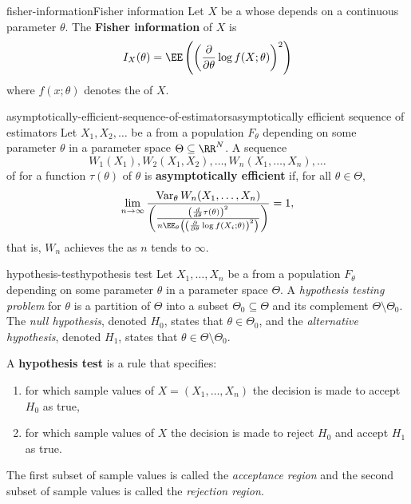 \begin{topic}{fisher-information}{Fisher information}
    Let $X$ be a  whose  depends on a continuous parameter $\theta$. The \textbf{Fisher information} of $X$ is
    \[ I_X(\theta) = \EE \left( \left( \frac{\partial}{\partial \theta} \log f(X; \theta) \right)^2 \right) \]
    where $f(x; \theta)$ denotes the  of $X$.
\end{topic}

\begin{topic}{asymptotically-efficient-sequence-of-estimators}{asymptotically efficient sequence of estimators}
    Let $X_1, X_2, \ldots$ be a  from a population $F_\theta$ depending on some parameter $\theta$ in a parameter space $\Theta \subseteq \RR^N$. A sequence
    \[ W_1(X_1), W_2(X_1, X_2), \ldots, W_n(X_1, \ldots, X_n), \ldots \]
    of  for a function $\tau(\theta)$ of $\theta$ is \textbf{asymptotically efficient} if, for all $\theta \in \Theta$,
    \[ \lim_{n \to \infty} \frac{\operatorname{Var}_\theta W_n(X_1, \ldots, X_n)}{\left( \frac{ \left( \frac{d}{d \theta} \tau(\theta) \right)^2}{n \EE_\theta \left( \left( \frac{\partial}{\partial \theta} \log f(X_i; \theta) \right)^2 \right) } \right)} = 1 , \]
    that is, $W_n$ achieves the  as $n$ tends to $\infty$.
\end{topic}

\begin{topic}{hypothesis-test}{hypothesis test}
    Let $X_1, \ldots, X_n$ be a  from a population $F_\theta$ depending on some parameter $\theta$ in a parameter space $\Theta$.
    A \textit{hypothesis testing problem} for $\theta$ is a partition of $\Theta$ into a subset $\Theta_0 \subseteq \Theta$ and its complement $\Theta \setminus \Theta_0$.
    The \textit{null hypothesis}, denoted $H_0$, states that $\theta \in \Theta_0$, and the \textit{alternative hypothesis}, denoted $H_1$, states that $\theta \in \Theta \setminus \Theta_0$.
    
    A \textbf{hypothesis test} is a rule that specifies:
    \begin{enumerate}[label=(\roman*)]
        \item for which sample values of $X = (X_1, \ldots, X_n)$ the decision is made to accept $H_0$ as true,
        \item for which sample values of $X$ the decision is made to reject $H_0$ and accept $H_1$ as true.
    \end{enumerate}
    The first subset of sample values is called the \textit{acceptance region} and the second subset of sample values is called the \textit{rejection region}.
\end{topic}

